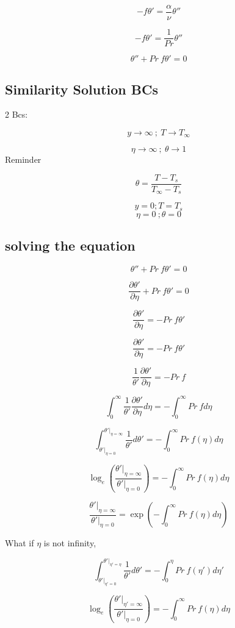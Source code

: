 \documentclass[11pt]{article}
\begin{document}
$$  -   f  \theta'   = \frac{ \alpha}{\nu} \theta'' $$

$$  -   f  \theta'   = \frac{1}{Pr} \theta'' $$

$$\theta'' + Pr \ f \theta' = 0$$

\subsection{Similarity Solution BCs}

2 Bcs:

$$y \rightarrow \infty \ ; \ T \rightarrow T_\infty$$

$$\eta \rightarrow \infty \ ; \ \theta \rightarrow 1$$
Reminder

$$\theta = \frac{T-T_s}{T_\infty - T_s}$$

$$y=0 ; T=T_s$$
$$\eta = 0 \  ; \theta = 0 $$

\subsection{solving the equation}

$$\theta'' + Pr \ f \theta' = 0$$

$$ \frac{\partial  \theta'}{\partial \eta} + Pr \ f \theta' = 0$$

$$ \frac{\partial  \theta'}{\partial \eta} = - Pr \ f \theta' $$

$$  \frac{\partial  \theta'}{\partial \eta} = - Pr \ f \theta' $$

$$ \frac{1}{\theta'} \frac{\partial  \theta'}{\partial \eta} = - Pr \ f$$

$$ \int_0^\infty  \frac{1}{\theta'} \frac{\partial  \theta'}{\partial \eta} d \eta = -  \int_0^\infty  Pr \ f d\eta $$

$$ \int_{\theta'|_{\eta=0}}^{\theta'|_{\eta=\infty}} \frac{1}{\theta'}  d \theta' = -  \int_0^\infty  Pr \ f (\eta) d\eta $$

$$ \log_e (\frac{\theta'|_{\eta=\infty}}{\theta'|_{\eta=0}}) = -  \int_0^\infty  Pr \ f (\eta) d\eta $$

$$ \frac{\theta'|_{\eta=\infty}}{\theta'|_{\eta=0}} = \exp ( -  \int_0^\infty  Pr \ f (\eta) d\eta) $$

What if $\eta$ is not infinity,

$$ \int_{\theta'|_{\eta'=0}}^{\theta'|_{\eta'=\eta}} \frac{1}{\theta'}  d \theta' = -  \int_0^\eta  Pr \ f (\eta') d\eta' $$

$$ \log_e (\frac{\theta'|_{\eta'=\infty}}{\theta'|_{\eta=0}}) = -  \int_0^\infty  Pr \ f (\eta) d\eta $$
\end{document}
